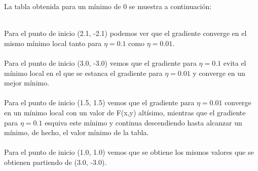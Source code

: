 La tabla obtenida para un mínimo de 0 se muestra a continuación:
\begin{table}[h]
\centering
{}
\end{table}
\\
Para el punto de inicio (2.1, -2.1) podemos ver que el gradiente converge en el mismo mínimo local tanto para $\eta = 0.1$ como $\eta = 0.01$.
\\
\\
Para el punto de inicio (3.0, -3.0) vemos que el gradiente para $\eta = 0.1$ evita el mínimo local en el que se estanca el gradiente para $\eta = 0.01$ y converge en un mejor mínimo.
\\
\\
Para el punto de inicio (1.5, 1.5) vemos que el gradiente para $ \eta = 0.01 $ converge en un mínimo local con un valor de F(x,y) altísimo, mientras que el gradiente para $ \eta = 0.1 $ esquiva este mínimo y continua descendiendo hasta alcanzar un mínimo, de hecho, el valor mínimo de la tabla.
\\
\\
Para el punto de inicio (1.0, 1.0) vemos que se obtiene los mismos valores que se obtienen partiendo de (3.0, -3.0).
\newpage
